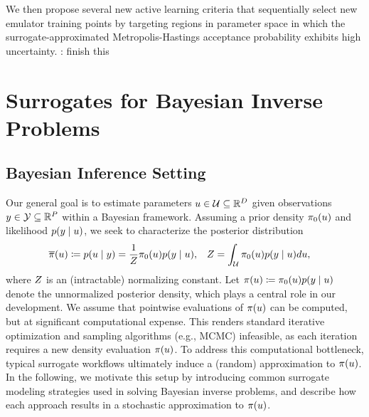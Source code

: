 \documentclass[12pt]{article}
\begin{document}
We then propose several new active learning criteria that sequentially select new emulator training
points by targeting regions in parameter space in which the surrogate-approximated Metropolis-Hastings
acceptance probability exhibits high uncertainty. 
\todo: finish this

\section{Surrogates for Bayesian Inverse Problems}

\subsection{Bayesian Inference Setting}
Our general goal is to estimate parameters $u \in \mathcal{U} \subseteq \mathbb{R}^{D}$ given 
observations $y \in \mathcal{Y} \subseteq \mathbb{R}^{P}$ within a Bayesian framework.
Assuming a prior density $\pi_0(u)$ and likelihood $p(y \mid u)$, 
we seek to characterize the posterior distribution 
\begin{align}
&\overline{\pi}(u) \coloneqq p(u \mid y) = \frac{1}{Z} \pi_0(u) p(y \mid u), 
&&Z = \int_{\mathcal{U}} \pi_0(u) p(y \mid u) du, \label{post_dens_generic}
\end{align}
where $Z$ is an (intractable) normalizing constant. 
Let $\pi(u) \coloneqq \pi_0(u) p(y \mid u)$ denote the unnormalized posterior 
density, which plays a central role in our development. 
We assume that pointwise evaluations of  $\pi(u)$ can be computed, but at significant 
computational expense. This renders standard iterative optimization and sampling algorithms 
(e.g., MCMC) infeasible, as each iteration requires a new density evaluation $\pi(u)$.
To address this computational bottleneck, typical surrogate workflows ultimately induce 
a (random) approximation to $\pi(u)$.
In the following, we motivate this setup by introducing common surrogate modeling strategies used 
in solving Bayesian inverse problems, and describe how each approach results in a 
stochastic approximation to $\pi(u)$.
\end{document}
